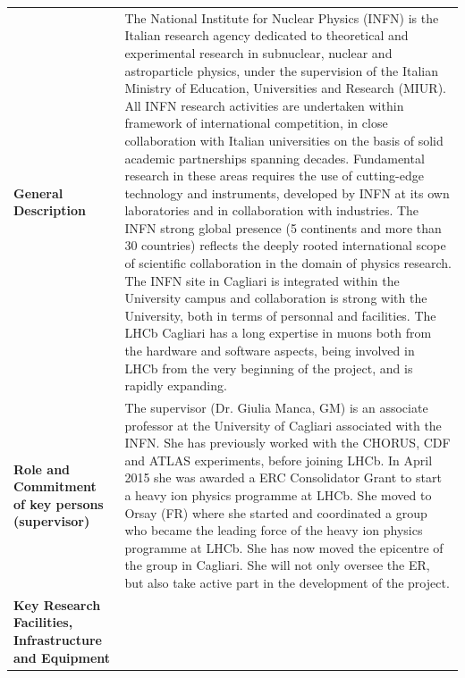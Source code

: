 \documentclass[a4paper,11pt]{article}
\begin{document}
{\footnotesize %
\noindent\begin{tabular}{>{\raggedright}p{}p{}}
  \multicolumn{2}{l}{\textbf{Beneficiary: INFN}} \\\midrule
\textbf{General Description} &
The National Institute for Nuclear Physics (INFN) is the Italian
research agency dedicated to theoretical and experimental research
in subnuclear, nuclear and astroparticle physics, under the
supervision of the Italian Ministry of Education, Universities and
Research (MIUR). All INFN research activities are undertaken within
framework of international competition, in close collaboration with
Italian universities on the basis of solid academic partnerships
spanning decades. Fundamental research in these areas requires the
use of cutting-edge technology and instruments, developed by INFN
at its own laboratories and in collaboration with industries. The INFN
strong global presence (5 continents and more than 30 countries)
reflects the deeply rooted international scope of scientific
collaboration in the domain of physics research. 
The INFN site in Cagliari is integrated within the University 
campus and collaboration is strong with the University, 
both in terms of personnal and facilities.
The LHCb Cagliari has a long expertise in 
muons both from the hardware and software 
aspects, being involved in LHCb from the very beginning 
of the project, and is rapidly expanding.
\\\midrule
\textbf{Role and Commitment of key persons (supervisor)} & %
The supervisor (Dr. Giulia Manca, GM) is an associate professor at the 
University of Cagliari associated with the INFN. 
She has previously worked with the CHORUS, CDF and ATLAS experiments, before joining LHCb.
In April 2015 she
was awarded a ERC Consolidator Grant to start a heavy ion physics 
programme at LHCb. She moved to Orsay (FR) 
where she started and coordinated a group
who became the leading force of the 
heavy ion physics programme at LHCb. 
She has now moved the epicentre of the group in Cagliari. 
She will not only oversee the ER, but also take active part in the development of the project.
\\\midrule
\textbf{Key Research Facilities, Infrastructure and Equipment} &

\end{tabular}}
\end{document}
